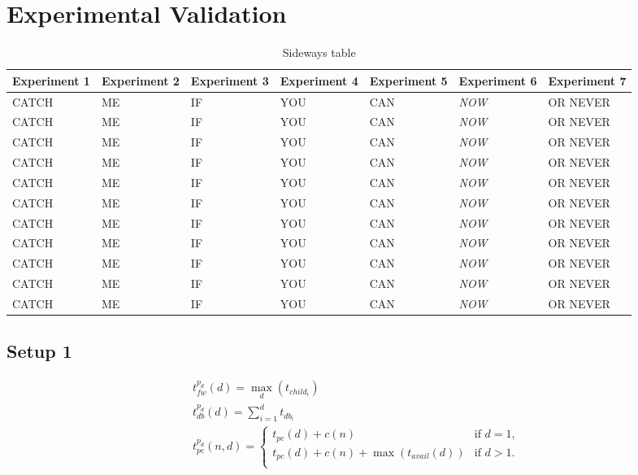 \section{Experimental Validation}


\begin{table}
      \centering
      \captionsetup{type=table}
      \caption{Sideways table}
      \begin{tabular}{lllllll}\toprule
  \textbf{Experiment 1}   & \textbf{Experiment 2}  & \textbf{Experiment 3} & \textbf{Experiment 4} & \textbf{Experiment 5} & \textbf{Experiment 6} & \textbf{Experiment 7}  \\ \midrule
  CATCH & ME & IF & YOU & CAN & \emph{NOW} & OR NEVER \\
  CATCH & ME & IF & YOU & CAN & \emph{NOW} & OR NEVER \\
  CATCH & ME & IF & YOU & CAN & \emph{NOW} & OR NEVER \\
  CATCH & ME & IF & YOU & CAN & \emph{NOW} & OR NEVER \\
  CATCH & ME & IF & YOU & CAN & \emph{NOW} & OR NEVER \\
  CATCH & ME & IF & YOU & CAN & \emph{NOW} & OR NEVER \\
  CATCH & ME & IF & YOU & CAN & \emph{NOW} & OR NEVER \\
  CATCH & ME & IF & YOU & CAN & \emph{NOW} & OR NEVER \\
  CATCH & ME & IF & YOU & CAN & \emph{NOW} & OR NEVER \\
  CATCH & ME & IF & YOU & CAN & \emph{NOW} & OR NEVER \\
  CATCH & ME & IF & YOU & CAN & \emph{NOW} & OR NEVER \\
  \bottomrule
      \end{tabular}\label{tbl:eval:experiments}
\end{table}


\subsection{Setup 1}



\small
\begin{equation}
  \begin{array}{l}
    \displaystyle t^{p_d}_{fw}(d) = \max_{d}(t_{child_{i}}) \\
    \displaystyle t^{p_d}_{db}(d) = \sum_{i=1}^{d} t_{db_{i}} \\
    \displaystyle t^{p_d}_{pc}(n,d) =
    	\begin{cases}
        	t_{pc}(d) + c(n) & \text{if $d = 1$,}\\
        	t_{pc}(d) + c(n) + \max(t_{avail}(d)) & \text{if $d>1$.}\\
        \end{cases}
  \end{array}\label{eq:var_idb}
\end{equation}
\normalsize

